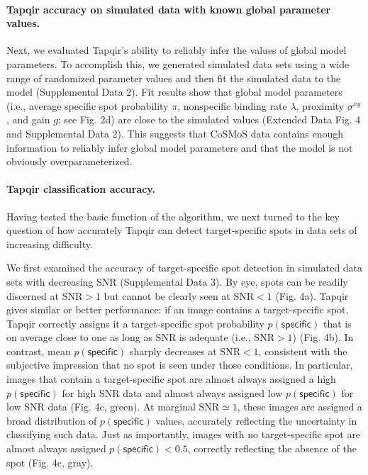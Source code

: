 \paragraph{Tapqir accuracy on simulated data with known global parameter values.}
Next, we evaluated Tapqir's ability to reliably infer the values of global model parameters. To  accomplish this, we generated simulated data sets using a wide range of randomized parameter values and then fit the simulated data to the model (Supplemental Data 2). Fit results show that global model parameters (i.e., average specific spot probability $\pi$, nonspecific binding rate $\lambda$, proximity $\sigma^{xy}$, and gain $g$; see Fig. 2d) are close to the simulated values (Extended Data Fig. 4 and Supplemental Data 2). This suggests that CoSMoS data contains enough information to reliably infer global model parameters and that the model is not obviously overparameterized. 

\paragraph{Tapqir classification accuracy.} Having tested the basic function of the algorithm, we next turned to the key question of how accurately Tapqir can detect target-specific spots in data sets of increasing difficulty.

We first examined the accuracy of target-specific spot detection in simulated data sets with decreasing SNR (Supplemental Data 3). By eye, spots can be readily discerned at $\mathrm{SNR}>1$ but cannot be clearly seen at $\mathrm{SNR}<1$ (Fig. 4a). Tapqir gives similar or better performance:  if an image contains a target-specific spot, Tapqir correctly assigns it a target-specific spot probability $p(\mathsf{specific})$ that is on average close to one as long as SNR is adequate (i.e., $\mathrm{SNR}>1$) (Fig. 4b).  In contrast, mean $p(\mathsf{specific})$ sharply decreases at $\mathrm{SNR}<1$, consistent with the subjective impression that no spot is seen under those conditions.  In particular, images that contain a target-specific spot are almost always assigned a high $p(\mathsf{specific})$ for high SNR data and almost always assigned low $p(\mathsf{specific})$ for low SNR data (Fig. 4c, green).  At marginal $\mathrm{SNR} \simeq 1$, these images are assigned a broad distribution of $p(\mathsf{specific})$ values, accurately reflecting the uncertainty in classifying such data.  Just as importantly, images with no target-specific spot are almost always assigned $p(\mathsf{specific}) < 0.5$, correctly reflecting the absence of the spot (Fig. 4c, gray).

